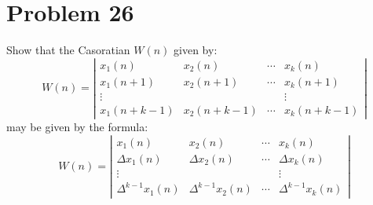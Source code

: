 \documentclass[12pt,letterpaper]{article}
\theoremstyle{definition}
\begin{document}
\section*{Problem 26}

Show that the Casoratian $W(n)$ given by:
\begin{equation}\label{eq:cassoratian}
    W(n) = \left|\begin{matrix}
        x_1(n) & x_2(n) &  \cdots & x_k(n) \\
        x_1(n+1) & x_2(n+1) & \cdots & x_k(n+1)\\
        \vdots & & & \vdots\\
        x_1(n+k-1) & x_2 (n+k-1) & \cdots & x_k(n+k-1)
    \end{matrix}\right|
\end{equation}
may be given by the formula:
\begin{equation*}
    W(n) = \left|\begin{matrix}
        x_1(n) & x_2(n) & \cdots & x_k(n)\\
        \Delta x_1(n) & \Delta x_2(n) & \cdots & \Delta x_k(n)\\
        \vdots & & & \vdots \\
        \Delta^{k-1}x_1(n) & \Delta^{k-1} x_2 (n) & \cdots & \Delta^{k-1} x_k(n)
    \end{matrix}\right|
\end{equation*}
\end{document}
